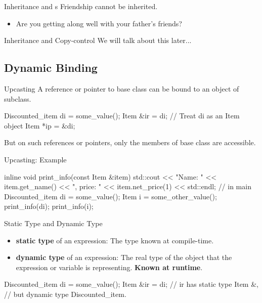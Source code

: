 \documentclass{beamer}
\begin{document}
\begin{frame}{Inheritance and s}
    Friendship cannot be inherited.
    \begin{itemize}
        \item Are you getting along well with your father's friends?
    \end{itemize}
\end{frame}

\begin{frame}{Inheritance and Copy-control}
    We will talk about this later...
\end{frame}

\subsection{Dynamic Binding}

\begin{frame}[fragile]{Upcasting}
    A reference or pointer to base class can be bound to an object of subclass. 
    \begin{cpp}
Discounted_item di = some_value();
Item &ir = di;  // Treat di as an Item object
Item *ip = &di;
    \end{cpp}
    But on such references or pointers, only the members of base class are accessible. 
\end{frame}

\begin{frame}[fragile]{Upcasting: Example}
    \begin{cpp}
inline void print_info(const Item &item) {
  std::cout << "Name: " << item.get_name()
            << ", price: " << item.net_price(1)
            << std::endl;
}
// in main
Discounted_item di = some_value();
Item i = some_other_value();
print_info(di);
print_info(i);
    \end{cpp}
\end{frame}

\begin{frame}[fragile]{Static Type and Dynamic Type}
    \begin{itemize}
        \item \textbf{static type} of an expression: The type known at compile-time.
        \item \textbf{dynamic type} of an expression: The real type of the object that the expression or variable is representing. \textbf{Known at runtime}.
    \end{itemize}
    \begin{cpp}
Discounted_item di = some_value();
Item &ir = di; // ir has static type Item &,
               // but dynamic type Discounted_item.
    \end{cpp}
\end{frame}
\end{document}
